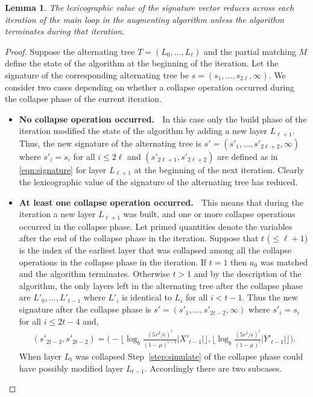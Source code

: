 \documentclass[11pt]{article}
\newtheorem{lemma}[theorem]{Lemma}
\theoremstyle{definition}
\theoremstyle{remark}
\begin{document}
\begin{lemma}\label{lem:decrease}
  The lexicographic value of the signature vector reduces across each iteration of the main loop in the augmenting algorithm unless the algorithm terminates during that iteration.
\end{lemma}
\begin{proof}
  Suppose the alternating tree $T=(L_0,\dots,L_\ell)$ and the partial matching $M$ define the state of the algorithm at the beginning of the iteration. Let the signature of the corresponding alternating tree be $s=(s_1,\dots,s_{2\ell},\infty)$. We consider two cases depending on whether a collapse operation occurred during the collapse phase of the current iteration.
  
  \begin{itemize}
  \item \textbf{No collapse operation occurred.} $\;$ In this case only the build phase of the iteration modified the state of the algorithm by adding a new layer $L_{\ell+1}$. Thus, the new signature of the alternating tree is $s'=(s'_1,\dots,s'_{2\ell+2},\infty)$ where $s'_i = s_i$ for all $i \leq 2\ell$ and $(s'_{2\ell+1}, s'_{2\ell+2})$ are defined as in \eqref{eqn:signature} for layer $L_{\ell+1}$ at the beginning of the next iteration. Clearly the lexicographic value of the signature of the alternating tree has reduced.

  \item \textbf{At least one collapse operation occurred.} $\;$ This means that during the iteration a new layer $L_{\ell+1}$ was built, and one or more collapse operations occurred in the collapse phase. Let primed quantities denote the variables after the end of the collapse phase in the iteration. Suppose that $t$ ($\leq \ell+1$) is the index of the earliest layer that was collapsed among all the collapse operations in the collapse phase in the iteration. If $t=1$ then $a_0$ was matched and the algorithm terminates. Otherwise $t > 1$ and by the description of the algorithm, the only layers left in the alternating tree after the collapse phase are $L'_0,\dots,L'_{t-1}$ where $L'_i$ is identical to $L_i$ for all $i < t-1$. Thus the new signature after the collapse phase is $s'=(s'_1,\dots,s'_{2t-2},\infty)$ where $s'_i = s_i$ for all $i \leq 2t-4$ and,
\begin{equation*}
\begin{split}
(s'_{2t-3}, s'_{2t-2})  = \bigg( -\lfloor \log_b \frac{(5r^2/\epsilon)^i }{(1-\mu)^{i-1}} |X'_{t-1}| \rfloor,\lfloor \log_b \frac{(5r^2/\epsilon)^i}{(1-\mu)^i} |Y'_{t-1}| \rfloor    \bigg).
\end{split}
\end{equation*}
When layer $L_t$ was collapsed Step~\ref{step:simulate} of the collapse phase could have possibly modified layer $L_{t-1}$. Accordingly there are two subcases.


\end{itemize}
\end{proof}
\end{document}
